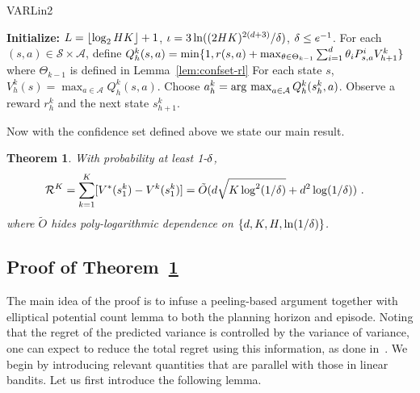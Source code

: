 \documentclass{article}
\newtheorem{theorem}{Theorem}
\newcommand{\blue}[1]{{\color[rgb]{.3,.5,1}#1}}
\newcommand{\gray}[1]{{ \color[rgb]{.6,.6,.6} #1 }}
\renewcommand{\blue}[1]{#1}
\begin{document}
\begin{algorithm}[t]
  \caption{VARLin2}
  \label{alg:VARLin2}
  \begin{algorithmic}[1]
    \STATE \textbf{Initialize:} $\blue{L}=\lt\lfl \log_2 HK\rt\rfl+1$, $\blue{\iota} = 3\ln((2HK)^{2(d+3)}/\dt)$, $\blue{\dt} \le e^{-1}$.
    \STATE For each $(s,a)\in \mathcal{S}\times\mathcal{A}$, define ${Q_h^k(s,a)}=\min\{1,r(s,a)+\max_{{\theta} \in \Theta_{k-1}} \sum_{i=1}^d {\theta}_i P_{s,a}^i V_{h+1}^k\}$ where $\Theta_{k-1}$ is defined in Lemma~\ref{lem:confset-rl}
    \STATE For each state $s$, ${V_h^k(s)}=\max_{a\in\mathcal{A}}Q_h^k(s,a)$.
    \ENDFOR
    \STATE Choose $a_h^k = \operatorname*{arg~max}_{a\in\mathcal{A}} Q_h^k(s_h^k,a)$. 
    \STATE Observe a reward $r_h^k$ and the next state $s_{h+1}^k$.
    \ENDFOR


    \ENDFOR
  \end{algorithmic}
\end{algorithm}
%
Now with the confidence set defined above we state our main result. 
\begin{theorem}\label{main-rl}
With probability at least 1-${\delta}$,
\begin{align*}
    \mathcal{R}^K
      &=\sum_{k=1}^K [V^*(s_1^k)-V^k(s_1^k)]
    = \tilde O(d\sqrt{K\log^2(1/{\delta})} + d^2\log (1/{\delta}))~.
\end{align*} 
where $\tilde O$ hides poly-logarithmic dependence on $\{d,K,H, \ln(1/{\delta})\}$.
\end{theorem}



\subsection{Proof of Theorem~\ref{main-rl}}
The main idea of the proof is to infuse a peeling-based argument together with elliptical potential count lemma to both the planning horizon and episode. 
Noting that the regret of the predicted variance is controlled by the variance of variance, one can expect to reduce the total regret using this information, as done in~\cite{zhang21variance}. We begin by introducing relevant quantities that are parallel with those in linear bandits. 
Let us first introduce the following lemma.
\end{document}
